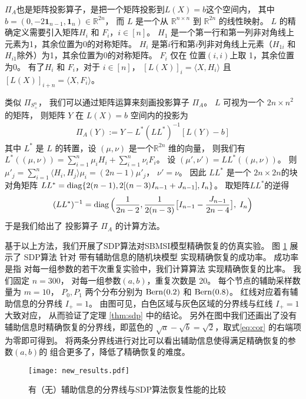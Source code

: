 $\Pi_A$也是矩阵投影算子，是把一个矩阵投影到$L(X) = b$这个空间内，
其中 $b=(0, -2 \mathbf{1}_{n-1}, \mathbf{1}_{n}) \in \mathbb{R}^{2n}$，
而
$L$ 是一个从 $\mathbb{R}^{n \times n} $ 到 $\mathbb{R}^{2n}$ 的线性映射。
$L$ 的精确定义需要引入矩阵$H_i$ 和 $F_i$，$i\in [n]$。
$H_1$ 是一个第一行和第一列非对角线上元素为1，其余位置为0的对称矩阵。
$H_i$ 是第$i$行和第$i$列非对角线上元素（$H_{1i}$ 和 $H_{i1}$除外）为1，其余位置为0的对称矩阵。
$F_i$ 仅在  位置$(i,i)$上取 1，其余位置为0。
有了$H_i$ 和 $F_i$，对于 $i \in [n]$，
$[L(X)]_i = \langle X,H_i \rangle$ 且 $[L(X)]_{i+n} = \langle X,F_i \rangle$。

类似 $\Pi_{S_+^n}$， 我们可以通过矩阵运算来刻画投影算子 $\Pi_{A}$。 
$L$ 可视为一个 $2n \times n^2$ 的矩阵，
则矩阵 $Y$ 在 $L(X)=b$ 空间内的投影为
\begin{align}\label{eq:proj:L:Y}
\Pi_{A}(Y) := Y - L^* (L L^*)^{-1}[ L(Y) - b] 
\end{align}
其中 $L^*$  是 $L$ 的转置，设 $(\mu,\nu)$ 是一个$\mathbb{R}^{2n}$ 维的向量，
则我们有 $L^*((\mu,\nu)) = \sum_{i=1}^n \mu_i H_i + \sum_{i=1}^n \nu_i F_i$。
设 $(\mu',\nu')=LL^*((\mu,\nu))$。
则$\mu'_j = \sum_{i=1}^n \langle H_i, H_j \rangle \mu_i
=(2n-1)\mu'_j$，
$\nu'=\nu$。
因此 $L L^*$ 是一个 $2n\times 2n$的块对角矩阵 
$LL^*=\operatorname{diag}\{2(n-1), 2[(n-3)I_{n-1}+J_{n-1}],I_n\} $。
取矩阵$L L^*$的逆得
\begin{align*}
(LL^*)^{-1} = \operatorname{diag}\Big(\frac{1}{2n-2},\frac{1}{2(n-3)} 
\big[ I_{n-1} - \frac{J_{n-1}}{2n-4} \big],\; I_n \Big)
\end{align*}
于是我们给出了 投影算子 $\Pi_{A} $ 
的计算方法。

基于以上方法，我们开展了SDP算法对SBMSI模型精确恢复的仿真实验。
图 \ref{fig:my_label} 展示了 SDP算法
针对 带有辅助信息的随机块模型 实现精确恢复的成功率。
成功率是指 对每一组参数的若干次重复实验中，我们计算算法
实现精确恢复的比率。
我们固定 $n=300$， 对每一组参数$(a,b)$，重复次数是 20。
每个节点的辅助采样数量为 $m=10$，
$P_0,P_1$ 两个分布分别为 $\operatorname{Bern}(0.2)$ 和 $\operatorname{Bern}(0.8)$。
红线对应着有辅助信息的分界线 $I_+ = 1$。
由图可见，白色区域与灰色区域的分界线与红线 $I_+ = 1$ 大致对应，
从而验证了定理 \ref{thm:sdp} 中的结论。
另外在图中我们还画出了没有辅助信息时精确恢复的分界线，即蓝色的 
$\sqrt{a}-\sqrt{b}=\sqrt{2}$，取式\eqref{eq:cor}
的右端项为零即可得到。
将两条分界线进行对比可以看出辅助信息使得满足精确恢复的参数$(a,b)$的
组合更多了，降低了精确恢复的难度。

\begin{figure}[!ht]
    \centering
    \texttt{[image: new\_results.pdf]}
    \caption{有（无）辅助信息的分界线与SDP算法恢复性能的比较}
    \label{fig:my_label}
\end{figure}

